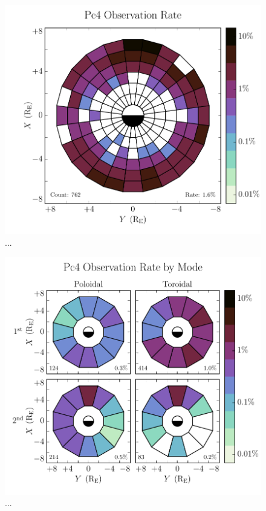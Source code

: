 \documentclass{article}
\begin{document}
\begin{figure}
    \label{fig_all}
    \begin{center}
    \includegraphics[width=\textwidth]{figures/fig_all.pdf}
    \caption{
        ...
    }
    \end{center}
\end{figure}


\begin{figure}
    \label{fig_mode}
    \begin{center}
    \includegraphics[width=\textwidth]{figures/fig_mode.pdf}
    \caption{
        ...
    }
    \end{center}
\end{figure}
\end{document}

